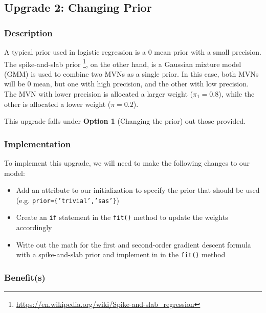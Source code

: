 \documentclass[12pt]{article}
\begin{document}
\subsection{Upgrade 2: Changing Prior}

\subsubsection{Description}

A typical prior used in logistic regression is a 0 mean prior with a small precision. The spike-and-slab prior \footnote{\url{https://en.wikipedia.org/wiki/Spike-and-slab_regression}}, on the other hand, is a Gaussian mixture model (GMM) is used to combine two MVNs as a single prior. In this case, both MVNs will be 0 mean, but one with high precision, and the other with low precision. The MVN with lower precision is allocated a larger weight ($\pi_1 = 0.8$), while the other is allocated a lower weight ($\pi = 0.2$).

This upgrade falls under \textbf{Option 1} (Changing the prior) out those provided.

\subsubsection{Implementation}

To implement this upgrade, we will need to make the following changes to our model:

\begin{itemize}
\item Add an attribute to our initialization to specify the prior that should be used (e.g. \texttt{prior=\{'trivial','sas'\}})
\item Create an \texttt{if} statement in the \texttt{fit()} method to update the weights accordingly
\item Write out the math for the first and second-order gradient descent formula with a spike-and-slab prior and implement in in the \texttt{fit()} method
\end{itemize}

\subsubsection{Benefit(s)}
\end{document}
